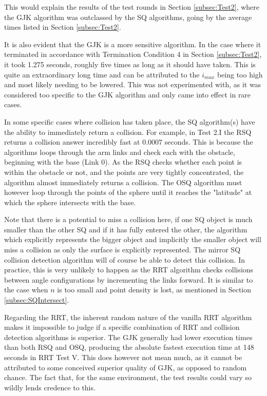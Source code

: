 This would explain the results of the test rounds in Section \ref{subsec:Test2}, where the \gls{GJK} algorithm was outclassed by the \gls{SQ} algorithms, going by the average times listed in Section \ref{subsec:Test2}.

It is also evident that the \gls{GJK} is a more sensitive algorithm. In the case where it terminated in accordance with Termination Condition 4 in Section \ref{subsec:Test2}, it took 1.275 seconds, roughly five times as long as it should have taken. This is quite an extraordinary long time and can be attributed to the $i_{max}$ being too high and most likely needing to be lowered. This was not experimented with, as it was considered too specific to the \gls{GJK} algorithm and only came into  effect in rare cases.

In some specific cases where collision has taken place, the \gls{SQ} algorithm(s) have the ability to immediately return a collision. For example, in Test 2.I the R\gls{SQ} returns a collision answer incredibly fast at 0.0007 seconds. This is because the algorithms loops through the arm links and check each with the obstacle, beginning with the base (Link 0). As the R\gls{SQ} checks whether each point is within the obstacle or not, and the points are very tightly concentrated, the algorithm almost immediately returns a collision. The O\gls{SQ} algorithm must however loop through the points of the sphere until it reaches the "latitude" at which the sphere intersects with the base. 

Note that there is a potential to miss a collision here, if one \gls{SQ} object is much smaller than the other \gls{SQ} and if it has fully entered the other, the algorithm which explicitly represents the bigger object and implicitly the smaller object will miss a collision as only the surface is explicitly represented. The mirror \gls{SQ} collision detection algorithm will of course be able to detect this collision. In practice, this is very unlikely to happen as the \gls{RRT} algorithm checks collisions between angle configurations by incrementing the links forward. It is similar to the case when $n$ is too small and point density is lost, as mentioned in Section \ref{subsec:SQIntersect}.

Regarding the \gls{RRT}, the inherent random nature of the vanilla \gls{RRT} algorithm makes it impossible to judge if a specific combination of \gls{RRT} and collision detection algorithms is superior. The \gls{GJK} generally had lower execution times than both R\gls{SQ} and O\gls{SQ}, producing the absolute fastest execution time at 148 seconds in \gls{RRT} Test V. This does however not mean much, as it cannot be attributed to some conceived superior quality of \gls{GJK}, as opposed to random chance. The fact that, for the same environment, the test results could vary so wildly lends credence to this.

